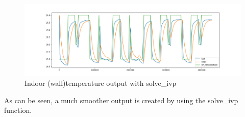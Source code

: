 \begin{figure}[ht]
	\centering
	\includegraphics[width=1\columnwidth]{pictures/solve_ivp_without_for_loop.png}
	\caption[Short title]{Indoor (wall)temperature output with \textsf{solve\_ivp}}
	\label{fig:profilelabels}
\end{figure}

As can be seen, a much smoother output is created by using the \textsf{solve\_ivp} function.








\newpage